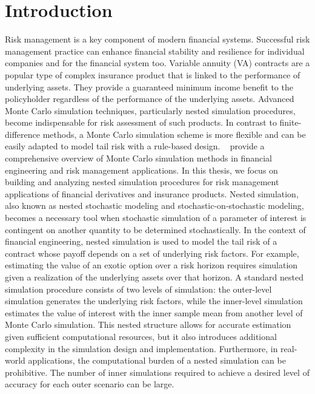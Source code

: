 \chapter{Introduction}

Risk management is a key component of modern financial systems.
Successful risk management practice can enhance financial stability and resilience for individual companies and for the financial system too.
Variable annuity (VA) contracts are a popular type of complex insurance product that is linked to the performance of underlying assets.
They provide a guaranteed minimum income benefit to the policyholder regardless of the performance of the underlying assets.
Advanced Monte Carlo simulation techniques, particularly nested simulation procedures, become indispensable for risk assessment of such products.
In contrast to finite-difference methods, a Monte Carlo simulation scheme is more flexible and can be easily adapted to model tail risk with a rule-based design.
~\cite{glasserman2004monte} provide a comprehensive overview of Monte Carlo simulation methods in financial engineering and risk management applications.
In this thesis, we focus on building and analyzing nested simulation procedures for risk management applications of financial derivatives and insurance products.
Nested simulation, also known as nested stochastic modeling and stochastic-on-stochastic modeling, becomes a necessary tool when stochastic simulation of a parameter of interest is contingent on another quantity to be determined stochastically.
In the context of financial engineering, nested simulation is used to model the tail risk of a contract whose payoff depends on a set of underlying risk factors.
For example, estimating the value of an exotic option over a risk horizon requires simulation given a realization of the underlying assets over that horizon.
A standard nested simulation procedure consists of two levels of simulation: the outer-level simulation generates the underlying risk factors, while the inner-level simulation estimates the value of interest with the inner sample mean from another level of Monte Carlo simulation.
This nested structure allows for accurate estimation given sufficient computational resources, but it also introduces additional complexity in the simulation design and implementation.
Furthermore, in real-world applications, the computational burden of a nested simulation can be prohibitive.
The number of inner simulations required to achieve a desired level of accuracy for each outer scenario can be large.
